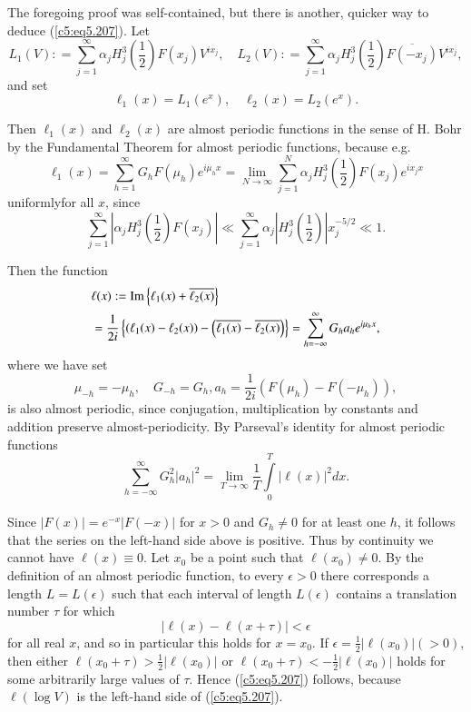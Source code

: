The foregoing proof was self-contained, but there is another, quicker
way to deduce (\ref{c5:eq5.207}). Let 
$$ 
L_1(V) : = \sum\limits^\infty_{j=1} \alpha_j H^3_j \left(\frac{1}{2}
\right) F (x_j) V^{ix_j},\quad L_2 (V) : = \sum\limits^\infty_{j=1}
\alpha_j H^3_j \left(\frac{1}{2} \right) \overline{F(-x_j)} V^{ix_j}, 
$$
and set
$$
\ell_1(x) = L_1 (e^x), \quad \ell_2(x) = L_2 (e^x).
$$

Then $\ell_1(x)$ and $\ell_2(x)$ are almost periodic functions in the
sense of H. Bohr \cite{Bohr1} by the Fundamental Theorem for almost
periodic functions, because e.g. 
$$ 
\ell_1(x) = \sum\limits^\infty_{h=1} G_h F(\mu_h) e^{i\mu_hx} =
\lim\limits_{N \to \infty} \sum\limits^N_{j=1} \alpha_j H^3_j
\left(\frac{1}{2} \right) F (x_j ) e^{i x_j x}  
$$
uniformly\pageoriginale for all $x$, since
$$ 
\sum\limits^\infty_{j=1} \left|\alpha_j H^3_j \left(\frac{1}{2}
\right) F(x_j)\right| \ll \sum\limits^\infty_{j=1} \alpha_j \left|H^3_j
\left(\frac{1}{2} \right)\right| x^{-5/2}_j \ll 1. 
$$

Then the function
\begin{align*}
& \ell (x) : = \operatorname{Im} \left\{\ell_1(x) + \overline{\ell_2(x)} \right\}\\ 
&= \frac{1}{2i} \left\{ (\ell_1(x) -\ell_2(x))  -
  \left(\overline{\ell_1(x)} - \overline{\ell_2(x)}\right)\right\} =
  \sum\limits^\infty_{h=-\infty} G_h a_h e^{i \mu_h x}, 
\end{align*}
where we have set
$$
\mu_{-h}  = - \mu_h,\quad G_{-h} = G_h, a_h =\frac{1}{2i} \left(F(\mu_h) -
F(-\mu_h)\right), 
$$
is also almost periodic, since conjugation, multiplication by
constants and addition preserve almost-periodicity. By Parseval's
identity for almost periodic functions 
$$
\sum\limits^\infty_{h =- \infty} G^2_h |a_h|^2 = \lim\limits_{T \to
  \infty} \frac{1}{T} \int\limits^T_0 |\ell(x)|^2 dx. 
$$

Since $|F(x)| = e^{-x} |F(-x)|$ for $x > 0$ and $G_h \neq 0$ for at
least one $h$, it follows that the series on the left-hand side above
is positive. Thus by continuity we cannot have $\ell(x) \equiv 0$. Let
$x_0$ be a point such that $\ell(x_0) \neq 0$. By the definition of an
almost periodic function, to every $\epsilon > 0$ there corresponds a
length $L = L(\epsilon)$ such that each interval of length
$L(\epsilon)$ contains a translation number $\tau$ for which  
$$
|\ell (x) - \ell (x + \tau)|  < \epsilon
$$
for all real $x$, and so in particular this holds for $x = x_0$. If
$\epsilon = \frac{1}{2}|\ell(x_0)| (>0)$, then either $\ell(x_0+\tau)
> \frac{1}{2} |\ell(x_0)|$ or $\ell(x_0 + \tau) <
-\frac{1}{2}|\ell(x_0)|$ holds for some arbitrarily large values of
$\tau$. Hence (\ref{c5:eq5.207}) follows, because $\ell (\log V)$ is
the left-hand side of (\ref{c5:eq5.207}). 

